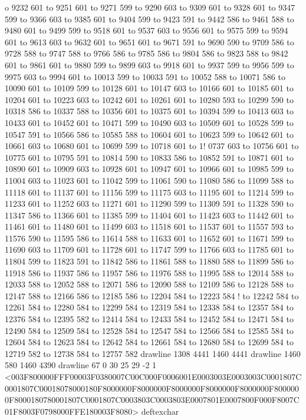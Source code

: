 o 9232 601 to 9251 601 to 9271 599 to 9290 603 to 9309 601 to 9328 601 to 9347 599 to 9366 603 to 9385 601 to 9404 599 to 9423 591 to 9442 586 to 9461 588 to 9480 601 to 9499 599 to 9518 601 to 9537 603 to 9556 601 to 9575 599 to 9594 601 to 9613 603 to 9632 601 to 9651 601 to 9671 591 to 9690 590 to 9709 586 to 9728 588 to 9747 588 to 9766 586 to 9785 586 to 9804 586 to 9823 588 to 9842 601 to 9861 601 to 9880 599 to 9899 603 to 9918 601 to 9937 599 to 9956 599 to 9975 603 to 9994 601 to 10013 599 to 10033 591 to 10052 588 to 10071 586 to 10090 601 to 10109 599 to 10128 601 to 10147 603 to 10166 601 to 10185 601 to 10204 601 to 10223 603 to 10242 601 to 10261 601 to 10280 593 to 10299 590 to 10318 586 to 10337 588 to 10356 601 to 10375 601 to 10394 599 to 10413 603 to 10433 601 to 10452 601 to 10471 599 to 10490 603 to 10509 601 to 10528 599 to 10547 591 to 10566 586 to 10585 588 to 10604 601 to 10623 599 to 10642 601 to 10661 603 to 10680 601 to 10699 599 to 10718 601 to 1!
0737 603 to 10756 601 to 10775 601
 to 10795 591 to 10814 590 to 10833 586 to 10852 591 to 10871 601 to 10890 601 to 10909 603 to 10928 601 to 10947 601 to 10966 601 to 10985 599 to 11004 603 to 11023 601 to 11042 599 to 11061 590 to 11080 586 to 11099 588 to 11118 601 to 11137 601 to 11156 599 to 11175 603 to 11195 601 to 11214 599 to 11233 601 to 11252 603 to 11271 601 to 11290 599 to 11309 591 to 11328 590 to 11347 586 to 11366 601 to 11385 599 to 11404 601 to 11423 603 to 11442 601 to 11461 601 to 11480 601 to 11499 603 to 11518 601 to 11537 601 to 11557 593 to 11576 590 to 11595 586 to 11614 588 to 11633 601 to 11652 601 to 11671 599 to 11690 603 to 11709 601 to 11728 601 to 11747 599 to 11766 603 to 11785 601 to 11804 599 to 11823 591 to 11842 586 to 11861 588 to 11880 588 to 11899 586 to 11918 586 to 11937 586 to 11957 586 to 11976 588 to 11995 588 to 12014 588 to 12033 588 to 12052 588 to 12071 586 to 12090 588 to 12109 586 to 12128 588 to 12147 588 to 12166 586 to 12185 586 to 12204 584 to 12223 584 !
to 12242 584 to 12261 584 to 12280
 584 to 12299 584 to 12319 584 to 12338 584 to 12357 584 to 12376 584 to 12395 582 to 12414 584 to 12433 584 to 12452 584 to 12471 584 to 12490 584 to 12509 584 to 12528 584 to 12547 584 to 12566 584 to 12585 584 to 12604 584 to 12623 584 to 12642 584 to 12661 584 to 12680 584 to 12699 584 to 12719 582 to 12738 584 to 12757 582 drawline
1308 4441 1460 4441 drawline
1460 580 1460 4390 drawline
67 0 30 25 29 -2 1 {{<003F800000FFF00003F0380007C00C000F0006001E0003003E0003003C0001807C0001807C00018078000180F8000000F8000000F8000000F8000000F8000000F8000000F8000180780001807C0001807C0003803C0003803E0007801E0007800F000F8007C01F8003F0798000FFE180003F8080>}} deftexchar

